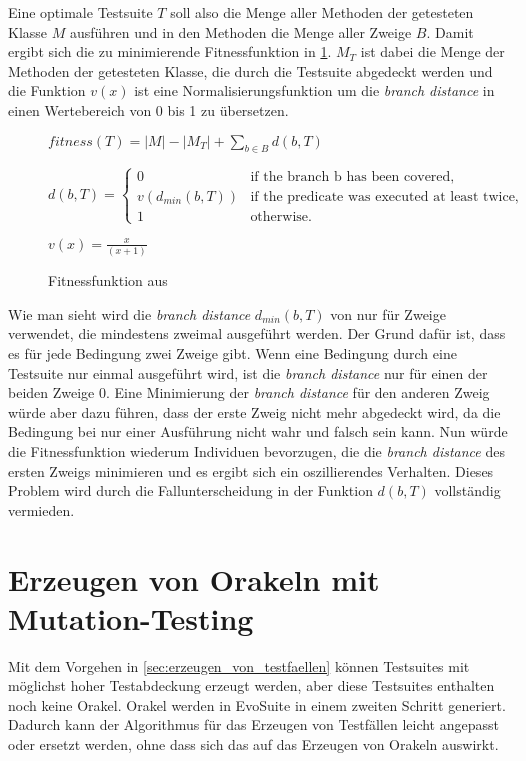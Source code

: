 \documentclass[a4paper,11pt]{article}
\begin{document}
Eine optimale Testsuite $T$ soll also die Menge aller Methoden der getesteten Klasse $M$ ausführen und in den Methoden die Menge aller Zweige $B$.
Damit ergibt sich die zu minimierende Fitnessfunktion in \cref{fig:fitnessfunktion}.
$M_T$ ist dabei die Menge der Methoden der getesteten Klasse, die durch die Testsuite abgedeckt werden und die Funktion $v(x)$ ist eine Normalisierungsfunktion um die \textit{branch distance} in einen Wertebereich von 0 bis 1 zu übersetzen.

\begin{figure}[h]
	$fitness(T) = |M| - |M_T| + \sum\limits_{b \in B} d(b, T)$

	$d(b, T) = \begin{cases}
	0 & \text{if the branch b has been covered,}\\
	v(d_{min}(b, T)) & \text{if the predicate was executed at least twice,}\\
	1 & \text{otherwise.}
	\end{cases}$

	$v(x) = \frac{x}{(x+1)}$
	\caption{Fitnessfunktion aus \cite{TSE12_EvoSuite}}
	\label{fig:fitnessfunktion}
\end{figure}

Wie man sieht wird die \textit{branch distance} $d_{min}(b, T)$ von \citet{10.1109/32.57624} nur für Zweige verwendet, die mindestens zweimal ausgeführt werden.
Der Grund dafür ist, dass es für jede Bedingung zwei Zweige gibt.
Wenn eine Bedingung durch eine Testsuite nur einmal ausgeführt wird, ist die \textit{branch distance} nur für einen der beiden Zweige 0.
Eine Minimierung der \textit{branch distance} für den anderen Zweig würde aber dazu führen, dass der erste Zweig nicht mehr abgedeckt wird, da die Bedingung bei nur einer Ausführung nicht wahr und falsch sein kann.
Nun würde die Fitnessfunktion wiederum Individuen bevorzugen, die die \textit{branch distance} des ersten Zweigs minimieren und es ergibt sich ein oszillierendes Verhalten.
Dieses Problem wird durch die Fallunterscheidung in der Funktion $d(b, T)$ vollständig vermieden.

\section{Erzeugen von Orakeln mit Mutation-Testing}
\label{sec:erzeugen_von_orakeln}

Mit dem Vorgehen in \cref{sec:erzeugen_von_testfaellen} können Testsuites mit möglichst hoher Testabdeckung erzeugt werden, aber diese Testsuites enthalten noch keine Orakel.
Orakel werden in EvoSuite in einem zweiten Schritt generiert.
Dadurch kann der Algorithmus für das Erzeugen von Testfällen leicht angepasst oder ersetzt werden, ohne dass sich das auf das Erzeugen von Orakeln auswirkt.
\end{document}
